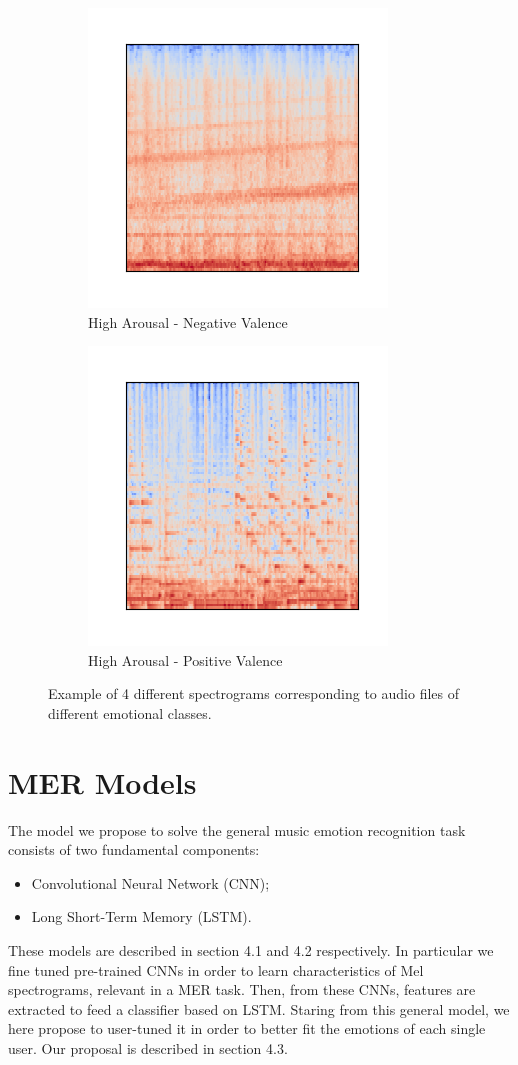 \documentclass[runningheads]{llncs}
\begin{document}
\begin{figure}
		\begin{subfigure}[t]{.4\textwidth}
         \centering
         \includegraphics[scale = 0.4]{img/Mel-2.png}
         \caption{High Arousal - Negative Valence}
	\end{subfigure}
	\quad
	\begin{subfigure}[t]{.4\textwidth}
		\centering
        \includegraphics[scale = 0.4]{img/Mel-3.png}
        \caption{High Arousal - Positive Valence}
	\end{subfigure}
	\caption{Example of 4 different spectrograms corresponding to audio files of different emotional classes.}
	\label{fig-spectrogram}
\end{figure}




\section{MER Models}
The model we propose to solve the general music emotion recognition task consists of two fundamental components:
\begin{itemize}
    \item Convolutional Neural Network (CNN);
    \item Long Short-Term Memory (LSTM).
\end{itemize}
These models are described in section 4.1 and 4.2 respectively.
In particular we fine tuned pre-trained CNNs in order to learn  characteristics of Mel
spectrograms, relevant in a MER task. Then, from these CNNs, features are extracted to feed a classifier based on LSTM. 
Staring from this general model, we here propose to user-tuned it in order to better fit the emotions of each single user. Our proposal is described in section 4.3.
\end{document}
